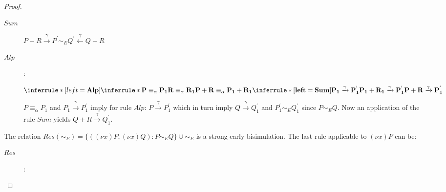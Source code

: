\begin{lemma}
\begin{proof}
\begin{description}
\begin{description}
	  \item[$Sum$]
	    $P+R \xrightarrow{\gamma} P^{'} \sim_{E} Q^{'} \stackrel{\gamma}{\longleftarrow} Q+R$
	  \item[$Alp$]:
	    \begin{center}
	      $\inferrule* [left=\bf{Alp}]{
		  \inferrule* {
		      P \equiv_{\alpha} P_{1}
		    \\
		      R \equiv_{\alpha} R_{1}
		  }{
		    P+R \equiv_{\alpha} P_{1}+R_{1}
		  }
		\\
		  \inferrule* [left=\bf{Sum}]{
		    P_{1} \xrightarrow{\gamma} P_{1}^{'}
		  }{
		    P_{1}+R_{1} \xrightarrow{\gamma} P_{1}^{'}
		  }
	      }{
		  P+R \xrightarrow{\gamma} P_{1}^{'}
	      }$
	    \end{center}
	    $P\equiv_{\alpha} P_{1}$ and $P_{1} \xrightarrow{\gamma} P_{1}^{'}$ imply for rule $Alp$: $P \xrightarrow{\gamma} P_{1}^{'}$ which in turn imply $Q \xrightarrow{\gamma} Q_{1}^{'}$ and $P_{1}^{'} \sim_{E} Q_{1}^{'}$ since $P\sim_{E}Q$. Now an application of the rule $Sum$ yields $Q+R \xrightarrow{\gamma} Q_{1}^{'}$.
	\end{description}
      \item[Restriction]
	The relation $Res(\sim_{E})=\{((\nu x)P, (\nu x)Q): P\sim_{E} Q\} \cup \sim_{E}$ is a strong early bisimulation. The last rule applicable to $(\nu x)P$ can be:
	\begin{description}
	  \item[$Res$]:

\end{description}
\end{description}
\end{proof}
\end{lemma}
